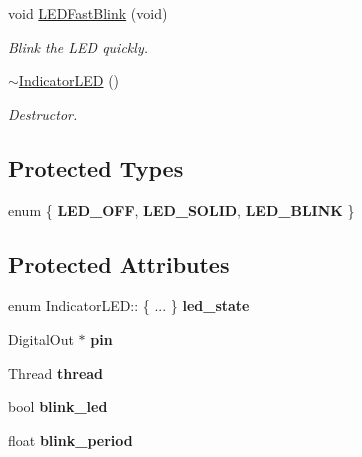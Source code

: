 \begin{DoxyCompactItemize}
\mbox{\label{classIndicatorLED_ac566d7708a4b46cd1abe853f320defb0}} 
void \hyperlink{classIndicatorLED_ac566d7708a4b46cd1abe853f320defb0}{L\+E\+D\+Fast\+Blink} (void)
\begin{DoxyCompactList}\small\item\em Blink the L\+ED quickly. \end{DoxyCompactList}\item 
\mbox{\label{classIndicatorLED_ac97893513aa6527e43e86adcd58b2b2d}} 
\hyperlink{classIndicatorLED_ac97893513aa6527e43e86adcd58b2b2d}{$\sim$\+Indicator\+L\+ED} ()
\begin{DoxyCompactList}\small\item\em Destructor. \end{DoxyCompactList}\end{DoxyCompactItemize}
\subsection*{Protected Types}
\begin{DoxyCompactItemize}
\item 
\mbox{\label{classIndicatorLED_a4f5c468fe07af641779e7b7c6976b5ab}} 
enum \{ {\bfseries L\+E\+D\+\_\+\+O\+FF}, 
{\bfseries L\+E\+D\+\_\+\+S\+O\+L\+ID}, 
{\bfseries L\+E\+D\+\_\+\+B\+L\+I\+NK}
 \}
\end{DoxyCompactItemize}
\subsection*{Protected Attributes}
\begin{DoxyCompactItemize}
\item 
\mbox{\label{classIndicatorLED_ae1ad69ec5e05d79873b5ba9e3b1b6c87}} 
enum Indicator\+L\+E\+D\+:: \{ ... \}  {\bfseries led\+\_\+state}
\item 
\mbox{\label{classIndicatorLED_a3a81835df63916bf2412f1f4d976062f}} 
Digital\+Out $\ast$ {\bfseries pin}
\item 
\mbox{\label{classIndicatorLED_ae369c8ca69f2adf6d4477cb08f733f3a}} 
Thread {\bfseries thread}
\item 
\mbox{\label{classIndicatorLED_a11d9a1d0f8545efeeea73e4f7daed1f5}} 
bool {\bfseries blink\+\_\+led}
\item 
\mbox{\label{classIndicatorLED_a742e1af0fb722acd6de7c130177e1027}} 
float {\bfseries blink\+\_\+period}
\end{DoxyCompactItemize}


